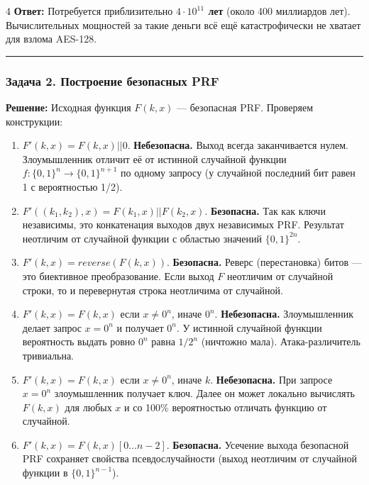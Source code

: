 ﻿\documentclass[8pt,a4paper,landscape]{extarticle}
\newcommand{\tightlist}{}
\begin{document}
\begin{multicols*}{4}
\textbf{Ответ:} Потребуется приблизительно \textbf{\(4 \cdot 10^{11}\) лет} (около 400 миллиардов лет). Вычислительных мощностей за такие деньги всё ещё катастрофически не хватает для взлома AES-128.

\begin{center}\rule{0.5\linewidth}{0.5pt}\end{center}

\subsubsection{Задача 2. Построение безопасных PRF}\label{ux437ux430ux434ux430ux447ux430-2.-ux43fux43eux441ux442ux440ux43eux435ux43dux438ux435-ux431ux435ux437ux43eux43fux430ux441ux43dux44bux445-prf}

\textbf{Решение:} Исходная функция \(F(k, x)\) --- безопасная PRF. Проверяем конструкции:

\begin{enumerate}
\def\labelenumi{\arabic{enumi}.}
\tightlist
\item
  \(F'(k, x) = F(k, x) || 0\). \textbf{Небезопасна.} Выход всегда заканчивается нулем. Злоумышленник отличит её от истинной случайной функции \(f: \{0,1\}^n \to \{0,1\}^{n+1}\) по одному запросу (у случайной последний бит равен 1 с вероятностью 1/2).
\item
  \(F'((k_1, k_2), x) = F(k_1, x) || F(k_2, x)\). \textbf{Безопасна.} Так как ключи независимы, это конкатенация выходов двух независимых PRF. Результат неотличим от случайной функции с областью значений \(\{0,1\}^{2n}\).
\item
  \(F'(k, x) = reverse(F(k, x))\). \textbf{Безопасна.} Реверс (перестановка) битов --- это биективное преобразование. Если выход \(F\) неотличим от случайной строки, то и перевернутая строка неотличима от случайной.
\item
  \(F'(k, x) = F(k, x)\) если \(x \neq 0^n\), иначе \(0^n\). \textbf{Небезопасна.} Злоумышленник делает запрос \(x = 0^n\) и получает \(0^n\). У истинной случайной функции вероятность выдать ровно \(0^n\) равна \(1/2^n\) (ничтожно мала). Атака-различитель тривиальна.
\item
  \(F'(k, x) = F(k, x)\) если \(x \neq 0^n\), иначе \(k\). \textbf{Небезопасна.} При запросе \(x = 0^n\) злоумышленник получает ключ. Далее он может локально вычислять \(F(k, x)\) для любых \(x\) и со 100\% вероятностью отличать функцию от случайной.
\item
  \(F'(k, x) = F(k, x)[0 \dots n-2]\). \textbf{Безопасна.} Усечение выхода безопасной PRF сохраняет свойства псевдослучайности (выход неотличим от случайной функции в \(\{0,1\}^{n-1}\)).
\end{enumerate}


\end{multicols*}
\end{document}
